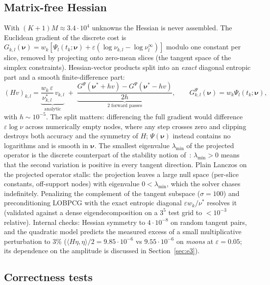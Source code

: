 \documentclass[11pt,leqno]{amsart}
\newcommand{\bnu}{\boldsymbol{\nu}}
\newcommand{\eps}{\varepsilon}
\numberwithin{equation}{section}
\theoremstyle{definition}
\begin{document}
\subsection{Matrix-free Hessian}
\label{sec:method-hessian}

With $(K+1)M\approx3.4\cdot10^4$ unknowns the Hessian is never assembled.
The Euclidean gradient of the discrete cost is
$G_{k,l}(\bnu)=w_k[\Psi_l(t_k;\bnu)+\eps(\log\nu_{k,l}-\log\nu^\infty_l)]$
modulo one constant per slice, removed by projecting onto zero-mean slices
(the tangent space of the simplex constraints).  Hessian-vector products
split into an \emph{exact} diagonal entropic part and a smooth
finite-difference part:
\begin{equation}
(Hv)_{k,l}
= \underbrace{\frac{w_k\,\eps}{\nu^*_{k,l}}\,v_{k,l}}_{\text{analytic}}
\;+\;
\underbrace{\frac{G^\Psi(\bnu^*+hv)-G^\Psi(\bnu^*-hv)}{2h}}_{\text{2 forward
passes}},\qquad G^\Psi_{k,l}(\bnu)=w_k\Psi_l(t_k;\bnu),
\end{equation}
with $h\sim10^{-5}$.  The split matters: differencing the full gradient
would difference $\eps\log\nu$ across numerically empty nodes, where any
step crosses zero and clipping destroys both accuracy and the symmetry of
$H$; $\Psi(\bnu)$ instead contains no logarithms and is smooth in $\bnu$.
The smallest eigenvalue $\lambda_{\min}$ of the projected operator is the
discrete counterpart of the stability notion of~\cite{DaudinDelarue2025}:
$\lambda_{\min}>0$ means that the second variation is positive in every
tangent direction.  Plain Lanczos on the projected operator stalls: the
projection leaves a large null space (per-slice constants, off-support
nodes) with eigenvalue $0<\lambda_{\min}$, which the solver chases
indefinitely.  Penalizing the complement of the tangent subspace
($\sigma=100$) and preconditioning LOBPCG with the exact entropic diagonal
$\eps w_k/\nu^*$ resolves it (validated against a dense eigendecomposition
on a $3^5$ test grid to $<10^{-3}$ relative).  Internal checks: Hessian
symmetry to $4\cdot10^{-8}$ on random tangent pairs, and the quadratic
model predicts the measured excess of a small multiplicative perturbation to
$3\%$ ($\langle H\eta,\eta\rangle/2=9.85\cdot10^{-6}$ vs
$9.55\cdot10^{-6}$ on \emph{moons} at $\eps=0.05$; its dependence on the
amplitude is discussed in Section~\ref{sec:e3}).

\subsection{Correctness tests}
\label{sec:method-tests}
\end{document}

